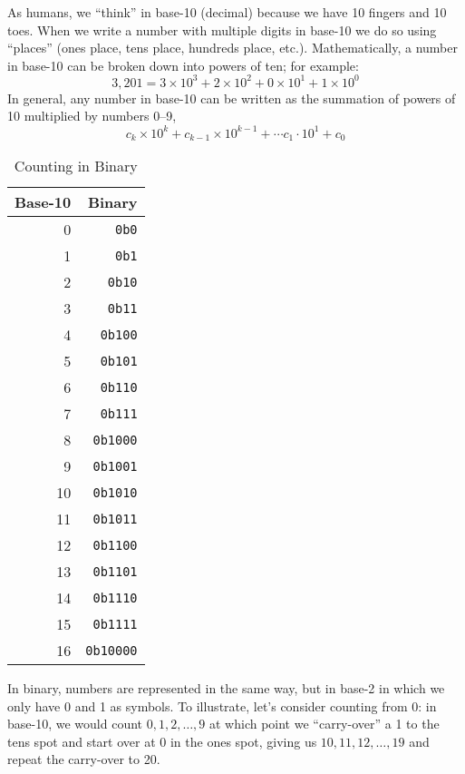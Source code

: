 As humans, we ``think'' in base-10 (decimal) because we have 10 fingers
and 10 toes.  When we write 
a number with multiple digits in base-10 we do so using ``places'' (ones place, 
tens place, hundreds place, etc.).  Mathematically, a number in base-10 
can be broken down into powers of ten; for example:
  $$3,201 = 3 \times 10^{3} + 2 \times 10^{2} + 0 \times 10^{1} + 1 \times 10^{0}$$
In general, any number in base-10 can be written as the summation of powers of 10
multiplied by numbers 0--9, 
  $$c_k \times 10^{k} + c_{k-1} \times 10^{k-1} + \cdots c_1 \cdot 10^{1} + c_0$$

\begin{wraptable}[22]{R}{0.40\textwidth}
\centering
\begin{tabular}{r|r}
Base-10 & Binary\\
\hline\hline
0 & \texttt{0b0} \\
1 & \texttt{0b1} \\
2 & \texttt{0b10} \\
3 & \texttt{0b11} \\
4 & \texttt{0b100} \\
5 & \texttt{0b101} \\
6 & \texttt{0b110} \\
7 & \texttt{0b111} \\
8 & \texttt{0b1000} \\
9 & \texttt{0b1001} \\
10 & \texttt{0b1010} \\
11 & \texttt{0b1011} \\
12 & \texttt{0b1100} \\
13 & \texttt{0b1101} \\
14 & \texttt{0b1110} \\
15 & \texttt{0b1111} \\
16 & \texttt{0b10000} \\
\end{tabular}
\caption{Counting in Binary}
\label{table:countingInBinary}
\end{wraptable}

In binary, numbers are represented in the same way, but in base-2 
in which we only
have 0 and 1 as symbols.  To illustrate, let's consider counting from 0: in base-10, we
would count $0, 1, 2, \ldots, 9$ at which point we ``carry-over'' a 1 to the tens spot
and start over at 0 in the ones spot, giving us $10, 11, 12, \ldots, 19$ and repeat the
carry-over to 20.  

